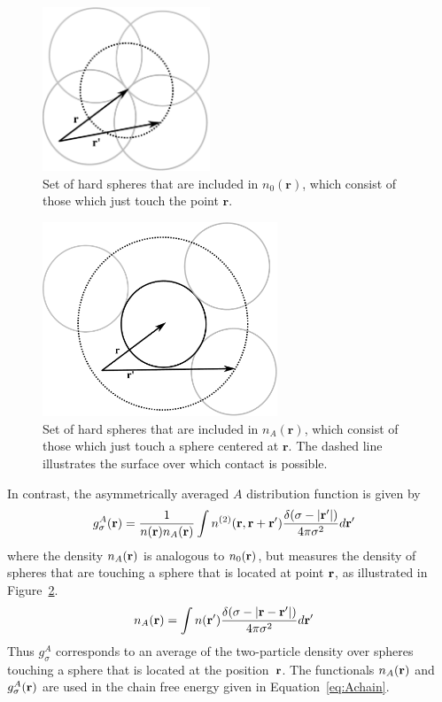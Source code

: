 \begin{figure}
\begin{center}
\includegraphics[width=5cm]{figs/n0}
\end{center}
\caption{Set of hard spheres that are included in $n_0(\mathbf{r})$, which
  consist of those which just touch the point $\mathbf{r}$.}
\label{fig:n0}
\end{figure}

\begin{figure}
\begin{center}
\includegraphics[width=7cm]{figs/nA}
\end{center}
\caption{Set of hard spheres that are included in $n_A(\mathbf{r})$,
  which consist of those which just touch a sphere centered at
  $\mathbf{r}$.  The dashed line illustrates the surface over which
  contact is possible.}
\label{fig:nA}
\end{figure}

In contrast, the asymmetrically averaged $A$ distribution function is
given by
\begin{align}
  g^A_\sigma(\textbf{r}) &= \frac{1}{n(\textbf{r})n_A(\textbf{r})}
  \int n^{(2)}(\textbf{r}, \textbf{r} + \textbf{r}')
  \frac{\delta(\sigma -|\textbf{r}'|)}{4\pi\sigma^2}d\textbf{r}' \label{eq:gA}
\end{align}
where the density $n_A(\textbf{r})$ is analogous to $n_0(\textbf{r})$, but measures the
density of spheres that are touching a sphere that is located at
point $\textbf{r}$, as illustrated in Figure~\ref{fig:nA}.
\begin{align}
  n_A(\textbf{r}) &= \int n(\textbf{r}')
  \frac{\delta(\sigma -|\textbf{r}-\textbf{r}'|)}{4\pi\sigma^2} d\textbf{r}' \label{eq:nA}
\end{align}
Thus $g_\sigma^A$ corresponds to an average of the two-particle
density over spheres touching a sphere that is located at the
position~$\textbf{r}$.  The functionals $n_A(\textbf{r})$ and $g_\sigma^A(\textbf{r})$ are
used in the chain free energy given in Equation~\ref{eq:Achain}.

